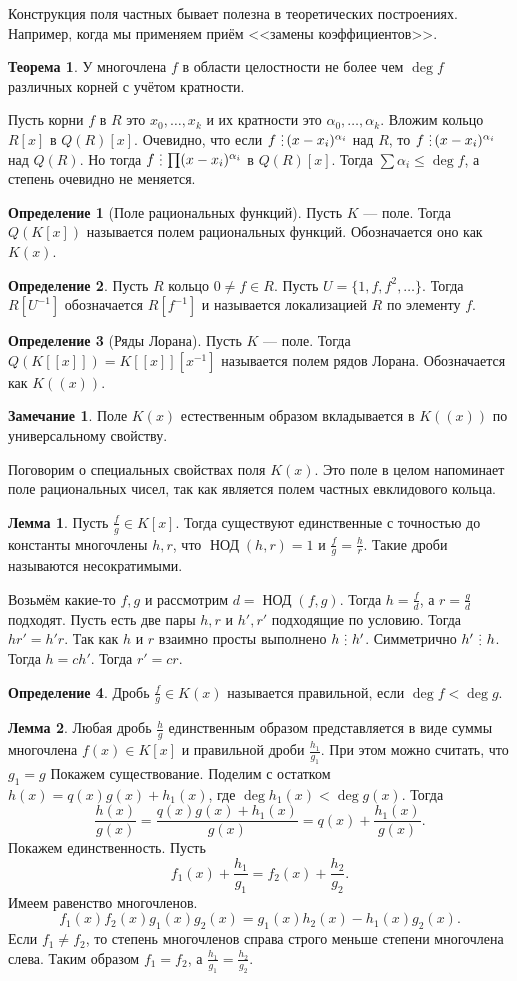 \documentclass[10pt,a4paper,oneside]{book}
\theoremstyle{definition}
\newtheorem*{rem}{Замечание}
\newtheorem{defn}{Определение}
\newtheorem{thm}{Теорема}
\newtheorem{lem}{Лемма}
\newcommand{\di}{\mathop{\,\scalebox{0.85}{\raisebox{-1.2pt}[0.5\height]{\vdots}}\,}}
\newcommand{\Nod}{\operatorname{\text{НОД}}}
\def\thrm{\begin{thm}}
\def\ethrm{\end{thm}}
\def\dfn{\begin{defn}}
\def\edfn{\end{defn}}
\def\lm{\begin{lem}}
\def\elm{\end{lem}}
\def\rm{\begin{rem}}
\def\erm{\end{rem}}
\begin{document}
Конструкция поля частных бывает полезна в теоретических построениях. Например, когда мы применяем приём <<замены коэффициентов>>.

\thrm У многочлена $f$ в области целостности не более чем $\deg f$ различных корней с учётом кратности. \ethrm 
\proof Пусть корни $f$ в $R$ это $x_0,\dots,x_k$ и их кратности это $\alpha_0,\dots,\alpha_k$. Вложим кольцо $R[x]$ в $Q(R)[x]$. Очевидно, что если $f\di (x-x_i)^{\alpha_i}$ над $R$, то $f\di (x-x_i)^{\alpha_i}$ над $Q(R)$. Но тогда $f\di \prod (x-x_i)^{\alpha_i}$ в $Q(R)[x]$. Тогда $  \sum \alpha_i \leq \deg f $, а степень очевидно не меняется.
\endproof



\dfn[Поле рациональных функций] Пусть $K$ --- поле. Тогда $Q(K[x])$ называется полем рациональных функций. Обозначается оно как $K(x)$.
\edfn

\dfn Пусть $R$ кольцо $0\neq f\in R$. Пусть $U=\{1,f,f^2,\dots\}$. Тогда $R[U^{-1}]$ обозначается $R[f^{-1}]$ и
называется локализацией $R$ по элементу  $f$.
\edfn


\dfn[Ряды Лорана] Пусть $K$ --- поле. Тогда $Q(K[[x]])=K[[x]][x^{-1}]$ называется полем рядов Лорана. Обозначается как $K((x))$.
\edfn

\rm Поле $K(x)$ естественным образом вкладывается в $K((x))$ по универсальному свойству.
\erm

Поговорим о специальных свойствах поля $K(x)$. Это поле в целом напоминает поле рациональных чисел, так как является полем частных евклидового кольца.

\lm Пусть $\frac{f}{g} \in K[x]$. Тогда существуют  единственные с точностью до константы многочлены  $h,r$, что $\Nod(h,r)=1$ и $\frac{f}{g}=\frac{h}{r}$. Такие дроби называются несократимыми.
\elm
\proof Возьмём какие-то $f,g$ и рассмотрим $d=\Nod(f,g)$. Тогда $h=\frac{f}{d}$, а $r=\frac{g}{d}$ подходят. Пусть есть две пары $h,r$ и $h',r'$ подходящие по условию. Тогда $hr'=h'r$. Так как $h$ и $r$ взаимно просты выполнено $h\di h'$. Симметрично $h'\di h$. Тогда $h=ch'$. Тогда $r'=cr$.
\endproof

\dfn Дробь $\frac{f}{g} \in K(x)$ называется правильной, если $\deg f< \deg g$. 
\edfn

\lm Любая дробь $\frac{h}{g}$ единственным образом представляется в виде суммы многочлена $f(x)\in K[x]$ и правильной дроби $\frac{h_1}{g_1}$. При этом можно считать, что $g_1=g$
\proof Покажем существование. Поделим с остатком $h(x)=q(x)g(x)+h_1(x)$, где $\deg h_1(x)<\deg g(x)$. Тогда 
$$\frac{h(x)}{g(x)} =\frac{q(x)g(x)+h_1(x)}{g(x)} =q(x)+\frac{h_1(x)}{g(x)}.$$
Покажем единственность. Пусть 
$$f_1(x)+\frac{h_1}{g_1}=f_2(x)+\frac{h_2}{g_2}.$$
Имеем равенство многочленов. 
$$f_1(x)f_2(x)g_1(x)g_2(x)=g_1(x)h_2(x)-h_1(x)g_2(x).$$
Если $f_1\neq f_2$, то степень многочленов справа строго меньше степени многочлена слева. Таким образом $f_1=f_2$, а $\frac{h_1}{g_1}=\frac{h_2}{g_2}$.
\endproof
\elm
\end{document}
